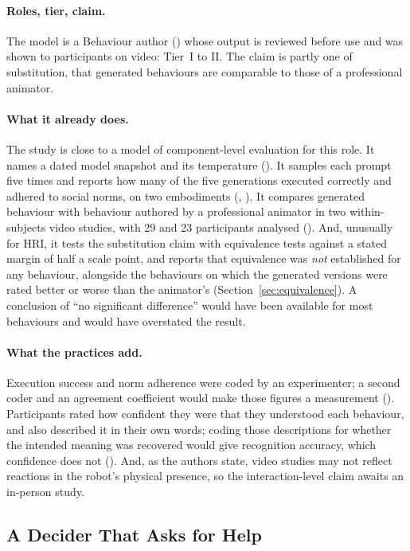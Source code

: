 \paragraph{Roles, tier, claim.} The model is a Behaviour author ()
whose output is reviewed before use and was shown to participants on video:
Tier~I to II. The claim is partly one of substitution, that generated
behaviours are comparable to those of a professional animator.

\paragraph{What it already does.} The study is close to a model of
component-level evaluation for this role. It names a dated model snapshot
and its temperature (). It samples each prompt five times and
reports how many of the five generations executed correctly and adhered to
social norms, on two embodiments (, ). It
compares generated behaviour with behaviour authored by a professional
animator in two within-subjects video studies, with 29 and 23 participants
analysed (). And, unusually for HRI, it tests the
substitution claim with equivalence tests against a stated margin of half a
scale point, and reports that equivalence was \emph{not} established for any
behaviour, alongside the behaviours on which the generated versions were
rated better or worse than the animator's (Section~\ref{sec:equivalence}).
A conclusion of ``no significant difference'' would have been available for
most behaviours and would have overstated the result.

\paragraph{What the practices add.} Execution success and norm adherence
were coded by an experimenter; a second coder and an agreement coefficient
would make those figures a measurement (). Participants rated
how confident they were that they understood each behaviour, and also
described it in their own words; coding those descriptions for whether the
intended meaning was recovered would give recognition accuracy, which
confidence does not (). And, as the authors state, video
studies may not reflect reactions in the robot's physical presence, so the
interaction-level claim awaits an in-person study.

\subsection{A Decider That Asks for Help}
\label{sec:exKnowNo}

